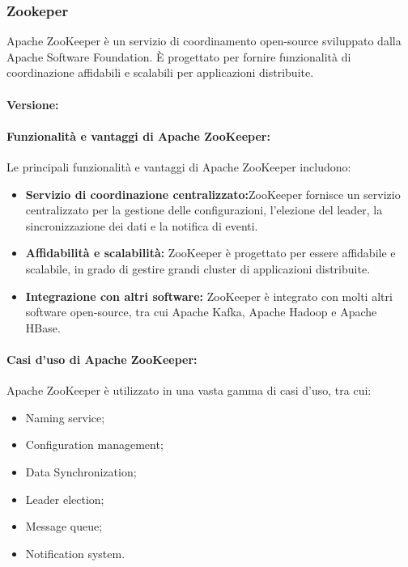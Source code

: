 \subsubsection{Zookeper}
Apache ZooKeeper è un servizio di coordinamento open-source sviluppato dalla Apache Software Foundation. È progettato per fornire funzionalità di coordinazione affidabili e scalabili per applicazioni distribuite.

\paragraph*{Versione:}

\paragraph*{Funzionalità e vantaggi di Apache ZooKeeper:}
Le principali funzionalità e vantaggi di Apache ZooKeeper includono:
\begin{itemize}
    \item \textbf{Servizio di coordinazione centralizzato:}ZooKeeper fornisce un servizio centralizzato per la gestione delle configurazioni, l'elezione del leader, la sincronizzazione dei dati e la notifica di eventi.
    \item \textbf{Affidabilità e scalabilità:} ZooKeeper è progettato per essere affidabile e scalabile, in grado di gestire grandi cluster di applicazioni distribuite.
    \item \textbf{Integrazione con altri software:} ZooKeeper è integrato con molti altri software open-source, tra cui Apache Kafka, Apache Hadoop e Apache HBase.
\end{itemize}
 
\paragraph*{Casi d'uso di Apache ZooKeeper:}

Apache ZooKeeper è utilizzato in una vasta gamma di casi d'uso, tra cui:
\begin{itemize}
    \item Naming service;
    \item Configuration management;
    \item Data Synchronization;
    \item Leader election;
    \item Message queue;
    \item Notification system.
\end{itemize}

